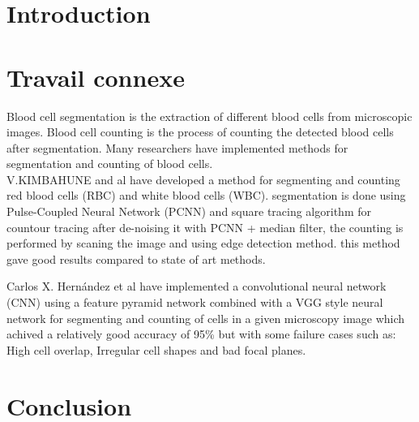\section{Introduction}
\vspace{0.2in}
\hspace*{0.16in}

\section{Travail connexe}
\vspace{0.2in}
\hspace*{0.16in}
Blood cell segmentation is the extraction of different blood cells from microscopic images. Blood cell counting is the process of counting the detected blood cells after segmentation. Many researchers have implemented methods for segmentation and counting of blood cells.\\

V.KIMBAHUNE and al \textsuperscript{\cite{V.KIMBAHUNE}} have developed a method for segmenting and counting red blood cells (RBC) and white blood cells (WBC).
segmentation is done using Pulse-Coupled Neural Network (PCNN) and square tracing algorithm for countour tracing after de-noising it with PCNN + median filter, the counting is performed by scaning the image and using edge detection method. this method gave good results compared to state of art methods.

Carlos X. Hern{\'{a}}ndez et al \textsuperscript{\cite{DBLP:journals/corr/abs-1802-10548}} have implemented a convolutional neural network (CNN) using a feature pyramid network combined with a VGG style neural network for segmenting and counting of cells in a given microscopy image which achived a relatively good accuracy of 95\% but with some failure cases such as: High cell overlap, Irregular cell shapes and bad focal planes.

\section{Conclusion}
\vspace{0.1in}
\hspace*{0.16in}
